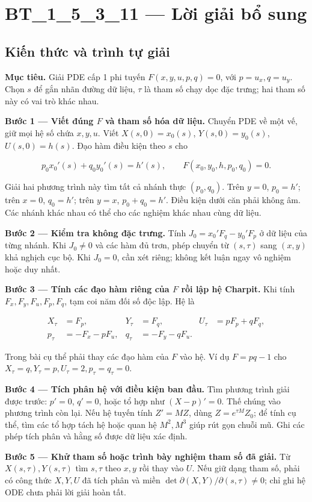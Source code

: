 \documentclass[10pt,a4paper]{article}
\begin{document}
\section*{BT\_1\_5\_3\_11 — Lời giải bổ sung}
\subsection*{Kiến thức và trình tự giải}
\textbf{Mục tiêu.} Giải PDE cấp 1 phi tuyến $F(x,y,u,p,q)=0$, với $p=u_x,q=u_y$. Chọn $s$ để gắn nhãn đường dữ liệu, $\tau$ là tham số chạy dọc đặc trưng; hai tham số này có vai trò khác nhau.

\textbf{Bước 1 — Viết đúng $F$ và tham số hóa dữ liệu.} Chuyển PDE về một vế, giữ mọi hệ số chứa $x,y,u$. Viết $X(s,0)=x_0(s)$, $Y(s,0)=y_0(s)$, $U(s,0)=h(s)$. Đạo hàm điều kiện theo $s$ cho

\[
p_0x_0'(s)+q_0y_0'(s)=h'(s),\qquad
F(x_0,y_0,h,p_0,q_0)=0.
\]

Giải hai phương trình này tìm tất cả nhánh thực $(p_0,q_0)$. Trên $y=0$, $p_0=h'$; trên $x=0$, $q_0=h'$; trên $y=x$, $p_0+q_0=h'$. Điều kiện dưới căn phải không âm. Các nhánh khác nhau có thể cho các nghiệm khác nhau cùng dữ liệu.

\textbf{Bước 2 — Kiểm tra không đặc trưng.} Tính $J_0=x_0'F_q-y_0'F_p$ ở dữ liệu của từng nhánh. Khi $J_0\ne0$ và các hàm đủ trơn, phép chuyển từ $(s,\tau)$ sang $(x,y)$ khả nghịch cục bộ. Khi $J_0=0$, cần xét riêng; không kết luận ngay vô nghiệm hoặc duy nhất.

\textbf{Bước 3 — Tính các đạo hàm riêng của $F$ rồi lập hệ Charpit.} Khi tính $F_x,F_y,F_u,F_p,F_q$, tạm coi năm đối số độc lập. Hệ là

\[
\begin{aligned}
X_\tau&=F_p,&Y_\tau&=F_q,&U_\tau&=pF_p+qF_q,\\
p_\tau&=-F_x-pF_u,&q_\tau&=-F_y-qF_u.
\end{aligned}
\]

Trong bài cụ thể phải thay các đạo hàm của $F$ vào hệ. Ví dụ $F=pq-1$ cho $X_\tau=q,Y_\tau=p,U_\tau=2,p_\tau=q_\tau=0$.

\textbf{Bước 4 — Tích phân hệ với điều kiện ban đầu.} Tìm phương trình giải được trước: $p'=0$, $q'=0$, hoặc tổ hợp như $(X-p)'=0$. Thế chúng vào phương trình còn lại. Nếu hệ tuyến tính $Z'=MZ$, dùng $Z=e^{\tau M}Z_0$; để tính cụ thể, tìm các tổ hợp tách hệ hoặc quan hệ $M^2, M^3$ giúp rút gọn chuỗi mũ. Ghi các phép tích phân và hằng số được dữ liệu xác định.

\textbf{Bước 5 — Khử tham số hoặc trình bày nghiệm tham số đã giải.} Từ $X(s,\tau),Y(s,\tau)$ tìm $s,\tau$ theo $x,y$ rồi thay vào $U$. Nếu giữ dạng tham số, phải có công thức $X,Y,U$ đã tích phân và miền $\det\partial(X,Y)/\partial(s,\tau)\ne0$; chỉ ghi hệ ODE chưa phải lời giải hoàn tất.
\end{document}
